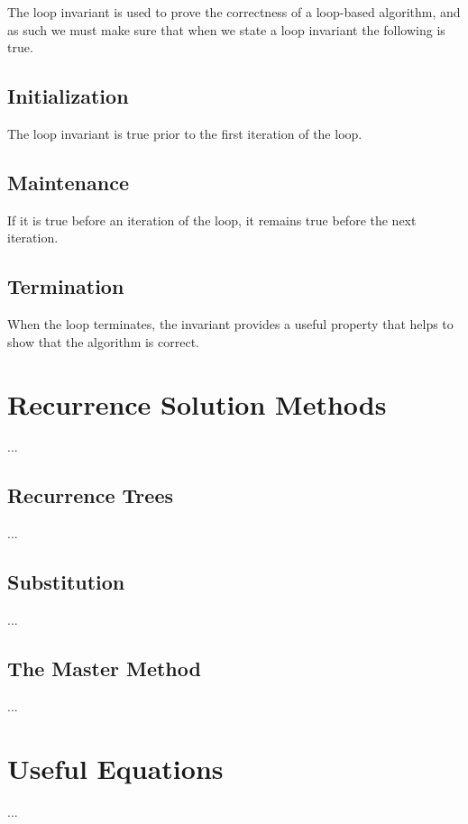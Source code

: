 The loop invariant is used to prove the correctness of a loop-based algorithm,
and as such we must make sure that when we state a loop invariant the
following is true.

\subsection{Initialization}
The loop invariant is true prior to the first iteration of the loop.

\subsection{Maintenance}
If it is true before an iteration of the loop, it remains true before the next
iteration.

\subsection{Termination}
When the loop terminates, the invariant provides a useful property that helps
to show that the algorithm is correct.

\newpage
\section{Recurrence Solution Methods}
...

\subsection{Recurrence Trees}
...

\subsection{Substitution}
...

\subsection{The Master Method}
...

\newpage
\section{Useful Equations}
...


